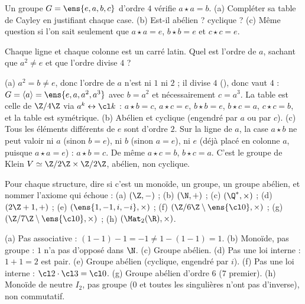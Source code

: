 \begin{exo}
Un groupe $G=\ens{e,a,b,c}$ d'ordre $4$ vérifie $a\star a=b$. (a) Compléter sa table de Cayley en justifiant chaque case. (b) Est-il abélien ? cyclique ? (c) Même question si l'on sait seulement que $a\star a=e$, $b\star b=e$ et $c\star c=e$.
\begin{indication}
Chaque ligne et chaque colonne est un carré latin. Quel est l'ordre de $a$, sachant que $a^2\neq e$ et que l'ordre divise $4$ ?
\end{indication}
\begin{corrige}
(a) $a^2=b\neq e$, donc l'ordre de $a$ n'est ni $1$ ni $2$ ; il divise $4$ (), donc vaut $4$ : $G=\langle a\rangle=\ens{e,a,a^2,a^3}$ avec $b=a^2$ et nécessairement $c=a^3$. La table est celle de $\Z/4\Z$ via $a^k\leftrightarrow\cl k$ : $a\star b=c$, $a\star c=e$, $b\star b=e$, $b\star c=a$, $c\star c=b$, et la table est symétrique.
(b) Abélien et cyclique (engendré par $a$ ou par $c$).
(c) Tous les éléments différents de $e$ sont d'ordre $2$. Sur la ligne de $a$, la case $a\star b$ ne peut valoir ni $a$ (sinon $b=e$), ni $b$ (sinon $a=e$), ni $e$ (déjà placé en colonne $a$, puisque $a\star a=e$) : $a\star b=c$. De même $a\star c=b$, $b\star c=a$. C'est le groupe de Klein $V\simeq\Z/2\Z\times\Z/2\Z$, abélien, non cyclique.
\end{corrige}
\end{exo}
\begin{exo}
Pour chaque structure, dire si c'est un monoïde, un groupe, un groupe abélien, et nommer l'axiome qui échoue : (a) $(\Z,-)$ ; (b) $(\N,+)$ ; (c) $(\Q^*,\times)$ ; (d) $(2\Z+1,+)$ ; (e) $(\ens{1,-1,i,-i},\times)$ ; (f) $(\Z/6\Z\setminus\ens{\cl0},\times)$ ; (g) $(\Z/7\Z\setminus\ens{\cl0},\times)$ ; (h) $(\Mat_2(\R),\times)$.
\begin{corrige}
(a) Pas associative : $(1-1)-1=-1\neq1-(1-1)=1$. (b) Monoïde, pas groupe : $1$ n'a pas d'opposé dans $\N$. (c) Groupe abélien. (d) Pas une loi interne : $1+1=2$ est pair. (e) Groupe abélien (cyclique, engendré par $i$). (f) Pas une loi interne : $\cl2\cdot\cl3=\cl0$. (g) Groupe abélien d'ordre $6$ ($7$ premier). (h) Monoïde de neutre $I_2$, pas groupe ($0$ et toutes les singulières n'ont pas d'inverse), non commutatif.
\end{corrige}
\end{exo}
